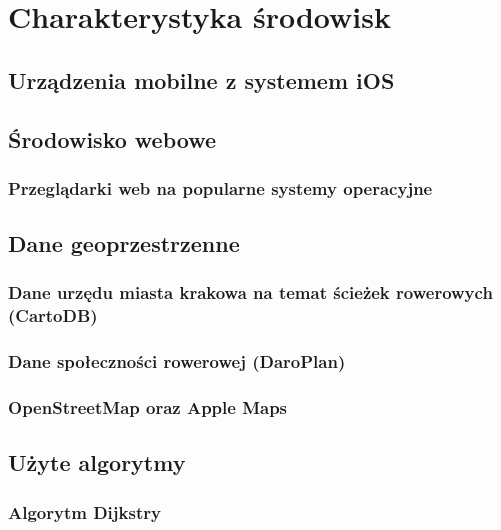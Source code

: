 \chapter{Charakterystyka środowisk}
\label{cha:charakterystyka_srodowisk}

\section{Urządzenia mobilne z systemem iOS}



\section{Środowisko webowe}



\subsection{Przeglądarki web na popularne systemy operacyjne}



\section{Dane geoprzestrzenne}


\subsection{Dane urzędu miasta krakowa na temat ścieżek rowerowych (CartoDB)}



\subsection{Dane społeczności rowerowej (DaroPlan)}



\subsection{OpenStreetMap oraz Apple Maps}



\section{Użyte algorytmy}



\subsection{Algorytm Dijkstry}




